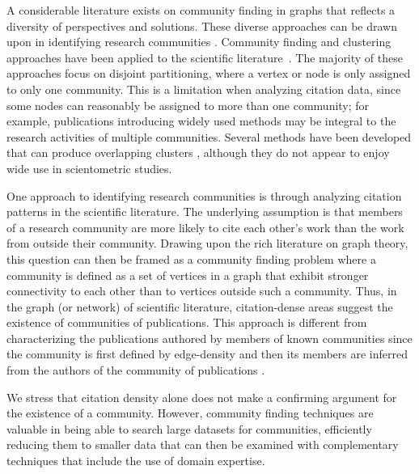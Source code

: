 \documentclass[12pt, oneside]{article}   	%
\begin{document}
A considerable literature exists on community finding in graphs that reflects a diversity of perspectives and solutions. These diverse approaches can be drawn upon in identifying research communities \citep{Fortunato2009,FORTUNATO201075,Coscia2011,Yang2016}.  Community finding and clustering approaches have been applied to the scientific literature~\citep{Newman2006,Fortunato2009,Boyack2010,Boyack2019,Traag2019,Ahlgren2020,Chandrasekharan2021,Wedell2022}. The majority of these approaches focus on disjoint partitioning, where a vertex or node is only assigned to only one community. 
This is a limitation when analyzing citation data, since some nodes can reasonably be assigned to more than one community; for example, publications introducing widely used methods may be integral to the research activities of multiple communities. 
Several methods have been developed that can produce overlapping clusters \citep{Baumes2005,Palla2005,banerjee2005model,Cleuziou2008,Lancichinetti2009,Lu2012}, although they do not appear to enjoy wide use in scientometric studies. 

One approach to identifying research communities is through analyzing citation patterns in the scientific literature. The underlying assumption is that members of a research community are more likely to cite each other's work than the work from outside their community.  Drawing upon the rich literature on graph theory, this question can then be framed as a community finding problem where a community is defined as a set of vertices in a graph that exhibit stronger connectivity to each other than to vertices outside such a community. Thus, in the graph (or network) of scientific literature, citation-dense areas suggest the existence of communities of publications. This approach is different from characterizing the publications authored by members of known communities \citep{Price1966,crane1972invisible,smallspecialties1979,Mullins1985} since the community is first defined by edge-density and then 
its members are inferred from the authors of the community of publications \citep{Chandrasekharan2021,Wedell2022}.

We stress that citation density alone does not make a confirming argument for the existence of a community. However, community finding techniques are valuable in being able to search large datasets for communities, efficiently reducing them to smaller data that can then be examined with complementary techniques that include the use of domain expertise.
\end{document}
